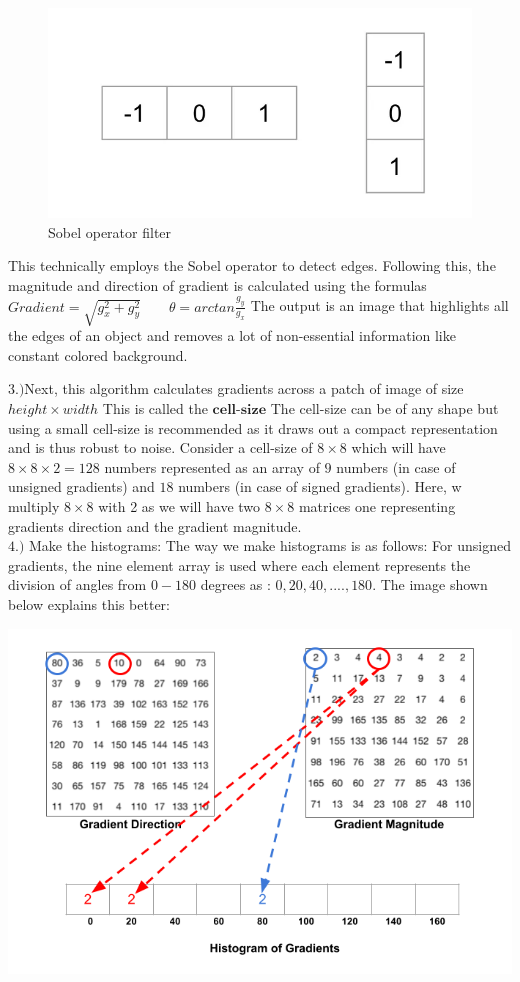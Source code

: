 \documentclass{article}
\begin{document}
\begin{figure}[h]
\centering
\includegraphics[width=\textwidth]{kernel.png}
\caption{Sobel operator filter\cite{mallick_2016}}
\end{figure}

This technically employs the Sobel operator\cite{1910.00138} to detect edges. Following this, the magnitude and direction of gradient is calculated using the formulas   $Gradient = \sqrt{g_x^2+g_y^2} \hspace{20pt}$   $\theta = arctan\frac{g_y}{g_x}$
The output is an image that highlights all the edges of an object and removes a lot of non-essential information like constant colored background.

$3.)$Next, this algorithm calculates gradients across a patch of image of size $height\times width$ This is called the $\textbf{cell-size}$ The cell-size can be of any shape but using a small cell-size is recommended as it draws out a compact representation and is thus robust to noise. Consider a cell-size of $8\times8$ which will have $8\times8\times2 = 128$ numbers represented as an array of $9$ numbers (in case of unsigned gradients) and $18$ numbers (in case of signed gradients). Here, w multiply $8\times8$ with 2 as we will have two $8\times8$ matrices one representing gradients direction and the gradient magnitude.\\

$4.)$ Make the histograms: The way we make histograms is as follows: For unsigned gradients, the nine element array is used where each element represents the division of angles from $0-180$ degrees as : $0,20,40, .... , 180$. The image\cite{mallick_2016} shown below explains this better:

\includegraphics[width=\textwidth]{hog1.png}
\end{document}
